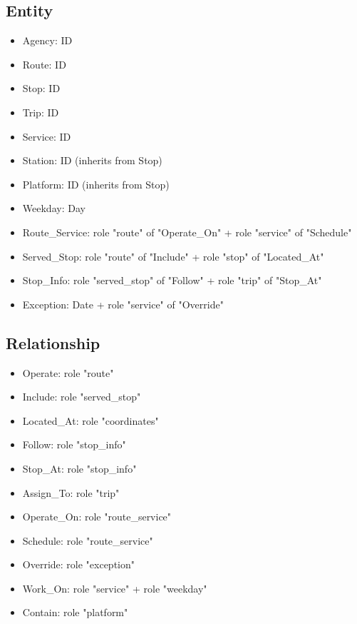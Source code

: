 \documentclass[a4paper, 12pt]{article}
\begin{document}
\subsection{Entity}
\begin{itemize}
    \item {Agency}: ID
    \item {Route}: ID
    \item {Stop}: ID
    \item {Trip}: ID
    \item {Service}: ID
    \item {Station}: ID (inherits from Stop)
    \item {Platform}: ID (inherits from Stop)
    \item {Weekday}: Day
    
    \item {Route\_Service}: role "route" of "Operate\_On" + role "service" of "Schedule"
    
    \item {Served\_Stop}: role "route" of "Include" + role "stop" of "Located\_At" 
    \item {Stop\_Info}: role "served\_stop" of "Follow" + role "trip" of "Stop\_At"
    
    \item {Exception}: Date + role "service" of "Override"
\end{itemize}

\subsection{Relationship}
\begin{itemize}
    \item {Operate}: role "route"
    \item {Include}: role "served\_stop"
    \item {Located\_At}: role "coordinates"
    \item {Follow}: role "stop\_info"
    \item {Stop\_At}: role "stop\_info"
    \item {Assign\_To}: role "trip"
    \item {Operate\_On}: role "route\_service"
    \item {Schedule}: role "route\_service"
    \item {Override}: role "exception"
    \item {Work\_On}: role "service" + role "weekday"
    \item {Contain}: role "platform"
\end{itemize}
\end{document}
